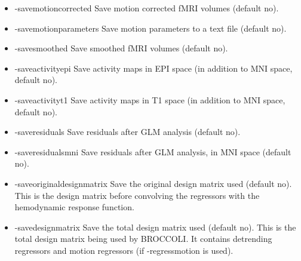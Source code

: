 \begin{itemize}
\item -savemotioncorrected       
\newline \newline Save motion corrected fMRI volumes (default no). 

\item -savemotionparameters       
\newline \newline Save motion parameters to a text file (default no). 

\item -savesmoothed              
\newline \newline Save smoothed fMRI volumes (default no). 

\item -saveactivityepi           
\newline \newline Save activity maps in EPI space \newline (in addition to MNI space, default no). 

\item -saveactivityt1            
\newline \newline Save activity maps in T1 space \newline (in addition to MNI space, default no). 

\item -saveresiduals             
\newline \newline Save residuals after GLM analysis (default no). 

\item -saveresidualsmni          
\newline \newline Save residuals after GLM analysis, in MNI space (default no). 

\item -saveoriginaldesignmatrix  
\newline \newline Save the original design matrix used (default no). This is the design matrix before convolving the regressors with the hemodynamic response function.

\item -savedesignmatrix          
\newline \newline Save the total design matrix used (default no). This is the total design matrix being used by BROCCOLI. It contains detrending regressors and motion regressors (if -regressmotion is used).


\end{itemize}
